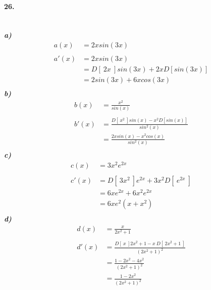 \documentclass[12pt, a4paper]{article}
\begin{document}
        \paragraph*{26.}
        \textit{
            \\
            \textbf{a)}
        }
        \begin{equation*}
            \begin{split}
                a(x)&= 2x sin(3x)\\\\
                a'(x)&= 2x sin(3x)\\
                &= D[~2x~]sin(3x)+ 2x D[sin(3x)]\\
                &= 2sin(3x) + 6xcos(3x)\\
            \end{split}
        \end{equation*}
        \textit{
            \textbf{b)}
        }
        \begin{equation*}
            \begin{split}
                b(x)&= \frac{x^2}{sin(x)}\\\\
                b'(x)&= \frac{D[~x^2~]sin(x)- x^2 D[sin(x)]}{sin^2(x)}\\
                &= \frac{2xsin(x)-x^2cos(x)}{sin^2(x)}\\
            \end{split}
        \end{equation*}
        \textit{
            \textbf{c)}
        }
        \begin{equation*}
            \begin{split}
                c(x)&= 3x^2 e^{2x}\\\\
                c'(x)&= D[~3x^2~]e^{2x}+ 3x^2 D[~e^{2x}~]\\
                &=6xe^{2x}+6x^2e^{2x}\\
                &=6xe^2(x+x^2)\\
            \end{split}
        \end{equation*}
        \textit{
            \textbf{d)}
        }
        \begin{equation*}
            \begin{split}
                d(x)&= \frac{x}{2x^2+1}\\\\
                d'(x)&=\frac{D[~x~]2x^2+1 -x~D[~2x^2+1~]}{(2x^2 + 1)^2}\\
                &=\frac{1-2x^2-4x^2}{(2x^2+1)^2}\\
                &=\frac{1-2x^2}{(2x^2+1)^2}\\
            \end{split}
        \end{equation*}
        \newpage
\end{document}
